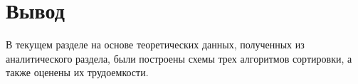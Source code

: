 \section*{Вывод}

В текущем разделе на основе теоретических данных, полученных из аналитического раздела, были построены схемы трех алгоритмов сортировки, а также оценены их трудоемкости.
